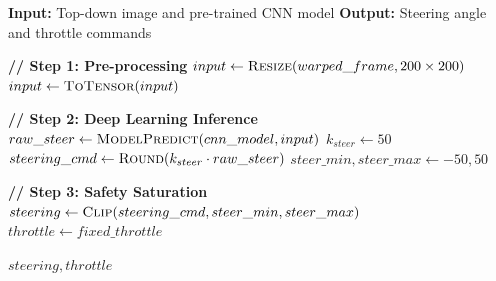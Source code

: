 \begin{algorithm}[H]
\caption{Navigation Agent: Neural Network Inference}
\label{alg:inference_logic}
\begin{algorithmic}[1]

    \State \textbf{Input:} Top-down image and pre-trained CNN model
    \State \textbf{Output:} Steering angle and throttle commands

    \Statex
    \State \textbf{// Step 1: Pre-processing}
    \State $input \gets \textsc{Resize}(warped\_frame, 200 \times 200)$
    \State $input \gets \textsc{ToTensor}(input)$ 

    \Statex
    \State \textbf{// Step 2: Deep Learning Inference}
    \State $raw\_steer \gets \textsc{ModelPredict}(cnn\_model, input)$ 
    \State $k_{steer} \gets 50$ 
    \State $steering\_cmd \gets \textsc{Round}(k_{steer} \cdot raw\_steer)$ 
    \State $steer\_min, steer\_max \gets -50, 50$ 

    \Statex
    \State \textbf{// Step 3: Safety Saturation}
    \State {}
    \State $steering \gets \textsc{Clip}(steering\_cmd, steer\_min, steer\_max)$
    \State $throttle \gets fixed\_throttle$ 

    \State \Return $steering, throttle$
\EndFunction

\end{algorithmic}
\end{algorithm}

